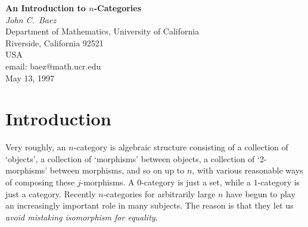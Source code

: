 \hfuzz=9pt      

      \begin{center}
      {\bf An Introduction to $n$-Categories\\}
       \vspace{0.3cm}
      {\em John C.\ Baez \\}
      \vspace{0.3cm}
      {\small Department of Mathematics,  University of California\\ 
      Riverside, California 92521 \\
      USA\\ }
      \vspace{0.3cm}
      {\small email: baez@math.ucr.edu\\}
      \vspace{0.3cm}
      {\small May 13, 1997 \\ }
      \end{center}

\begin{abstract} An $n$-category is some sort of
algebraic structure consisting of objects, morphisms between objects,
2-morphisms between morphisms, and so on up to $n$-morphisms, together
with various ways of composing them.  We survey various concepts of
$n$-category, with an emphasis on `weak' $n$-categories, in which all
rules governing the composition of $j$-morphisms hold only up to
equivalence.  (An $n$-morphism is an equivalence if it is
invertible, while a $j$-morphism for $j < n$ is an equivalence if it is
invertible up to a $(j+1)$-morphism that is an equivalence.)  We discuss
applications of weak $n$-categories to various subjects including
homotopy theory and topological quantum field theory, and review the
definition of weak $n$-categories recently proposed by Dolan and the
author.  \end{abstract}

\section{Introduction}

Very roughly, an $n$-category is algebraic structure consisting
of a collection of `objects', a collection of `morphisms' between
objects, a collection of `2-morphisms' between morphisms, and so on up
to $n$, with various reasonable ways of composing these $j$-morphisms.
A $0$-category is just a set, while a $1$-category is just a category.
Recently $n$-categories for arbitrarily large $n$ have begun to play an
increasingly important role in many subjects.  The reason is that they
let us {\it avoid mistaking isomorphism for equality}.  

